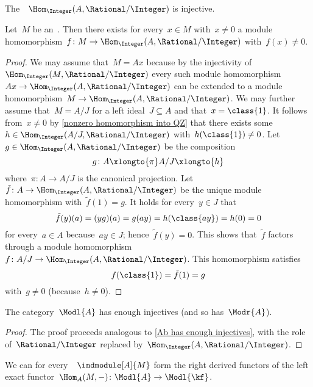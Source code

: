 \begin{example*}
  The~{}~$\Hom_\Integer(A, \Rational/\Integer)$ is injective.
\end{example*}


\begin{lemma*}
  Let~$M$ be an~{}.
  Then there exists for every~$x \in M$ with~$x \neq 0$ a module homomorphism~$f \colon M \to \Hom_\Integer(A, \Rational/\Integer)$ with~$f(x) \neq 0$.
\end{lemma*}


\begin{proof}
  We may assume that~$M = A x$ because by the injectivity of~$\Hom_\Integer(M, \Rational/\Integer)$ every such module homomorphism~$Ax \to \Hom_\Integer(A, \Rational/\Integer)$ can be extended to a module homomorphism~$M \to \Hom_\Integer(A, \Rational/\Integer)$.
  We may further assume that~$M = A/J$ for a left ideal~$J \subseteq A$ and that~$x = \class{1}$.
  It follows from~$x \neq 0$ by \cref{nonzero homomorphism into QZ} that there exists some~$h \in \Hom_\Integer(A/J, \Rational/\Integer)$ with~$h(\class{1}) \neq 0$.
  Let~$g \in \Hom_\Integer(A, \Rational/\Integer)$ be the composition
  \[
    g
    \colon
    A
    \xlongto{\pi}
    A/J
    \xlongto{h}
  \]
  where~$\pi \colon A \to A/J$ is the canonical projection.
  Let~$\tilde{f} \colon A \to \Hom_\Integer(A, \Rational/\Integer)$ be the unique module homomorphism with~$\tilde{f}(1) = g$.
  It holds for every~$y \in J$ that
  \[
    \tilde{f}(y)(a)
    =
    (y g)(a)
    =
    g(ay)
    =
    h(\class{ay})
    =
    h(0)
    =
    0
  \]
  for every~$a \in A$ because~$ay \in J$;
  hence~$\tilde{f}(y) = 0$.
  This shows that~$\tilde{f}$ factors through a {\welldef} module homomorphism~$f \colon A/J \to \Hom_\Integer(A, \Rational/\Integer)$.
  This homomorphism satisfies
  \[
    f(\class{1})
    =
    \tilde{f}(1)
    =
    g
  \]
  with~$g \neq 0$ (because~$h \neq 0$).
\end{proof}


\begin{corollary}
  The category~$\Modl{A}$ has enough injectives (and so has~$\Modr{A}$).
\end{corollary}


\begin{proof}
    The proof proceeds analogous to \cref{Ab has enough injectives}, with the role of~$\Rational/\Integer$ replaced by~$\Hom_\Integer(A, \Rational/\Integer)$.
\end{proof}







\begin{remark}
  We can for every~{}~$\indmodule[A]{M}$ form the right derived functors of the left exact functor~$\Hom_A(M, -) \colon \Modl{A} \to \Modl{\kf}$.
\end{remark}




